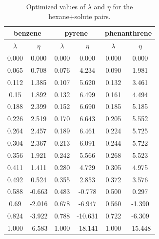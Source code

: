 \documentclass[final,12p,times,twocolumn]{elsarticle}
\begin{document}
	\section{}
	\label{}
\begin{table}[h]
	\centering
	\caption{Optimized values of $\lambda $ and $\eta $ for the hexane+solute pairs.}
	\label{tbl:lambdahex}
	\begin{tabular}{cccccc}
		\hline\hline
		\multicolumn{2}{c}{benzene}&\multicolumn{2}{c}{pyrene}& \multicolumn{2}{c}{phenanthrene}\\
		\hline\hline
		$\lambda$ & $\eta$& $\lambda$ & $\eta$  & $\lambda$ & $\eta$   \\ 
		\hline\hline
		0.000     &0.000      & 0.000    &    0.000    &    0.000    &    0.000    \\
		0.065     &0.708  & 0.076    &    4.234    &    0.090    &    1.981    \\
		0.112     &1.385  & 0.107    &    5.620    &    0.132    &    3.461    \\
		0.15      &1.892  & 0.132    &    6.499    &    0.161    &    4.494    \\
		0.188     &2.399  & 0.152    &    6.690    &    0.185    &    5.185    \\
		0.226     &2.519  & 0.170    &    6.643    &    0.205    &    5.552    \\
		0.264     &2.457  & 0.189    &    6.461    &    0.224    &    5.725    \\
		0.304     &2.367  & 0.213    &    6.091    &    0.244    &    5.722    \\
		0.356     &1.921  & 0.242    &    5.566    &    0.268    &    5.523    \\
		0.411     &1.411  & 0.280    &    4.729    &    0.305    &    4.975    \\
		0.492     &0.524  & 0.355    &    2.853    &    0.372    &    3.576    \\
		0.588     &-0.663 & 0.483    &    -0.778    &    0.500    &    0.297    \\
		0.69      &-2.016 & 0.678    &    -6.947    &    0.560    &    -1.390    \\
		0.824     &-3.922 & 0.788    &    -10.631    &    0.722    &    -6.309    \\
		1.000         &-6.583  &1.000      &    -18.141    &    1.000    &    -15.448    \\
		\hline\hline   
	\end{tabular}
\end{table}
\end{document}
